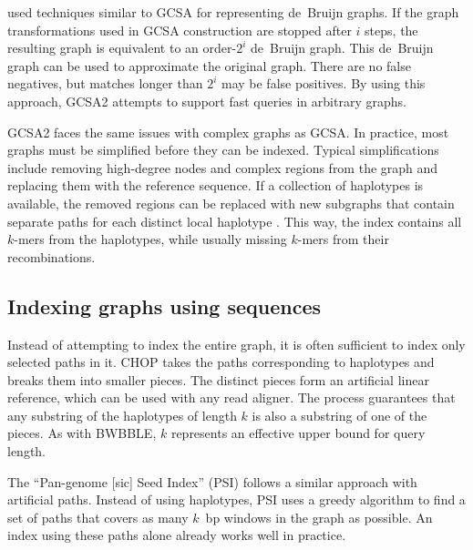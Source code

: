 \citeauthor{Bowe_2012} \cite{Bowe_2012} used techniques similar to GCSA for representing de~Bruijn graphs.
If the graph transformations used in GCSA construction are stopped after $i$ steps, the resulting graph is equivalent to an order-$2^{i}$ de~Bruijn graph.
This de~Bruijn graph can be used to approximate the original graph.
There are no false negatives, but matches longer than $2^{i}$ may be false positives.
By using this approach, GCSA2 \cite{Siren_2017} attempts to support fast queries in arbitrary graphs.

GCSA2 faces the same issues with complex graphs as GCSA.
In practice, most graphs must be simplified before they can be indexed.
Typical simplifications include removing high-degree nodes and complex regions from the graph and replacing them with the reference sequence.
If a collection of haplotypes is available, the removed regions can be replaced with new subgraphs that contain separate paths for each distinct local haplotype \cite{Siren_2019}.
This way, the index contains all $k$-mers from the haplotypes, while usually missing $k$-mers from their recombinations.

\subsection{Indexing graphs using sequences}

Instead of attempting to index the entire graph, it is often sufficient to index only selected paths in it.
CHOP \cite{Mokveld_2018} takes the paths corresponding to haplotypes and breaks them into smaller pieces.
The distinct pieces form an artificial linear reference, which can be used with any read aligner.
The process guarantees that any substring of the haplotypes of length $k$ is also a substring of one of the pieces.
As with BWBBLE, $k$ represents an effective upper bound for query length.

The ``Pan-genome [sic] Seed Index'' (PSI) \cite{Ghaffaari_2019} follows a similar approach with artificial paths.
Instead of using haplotypes, PSI uses a greedy algorithm to find a set of paths that covers as many $k$~bp windows in the graph as possible.
An index using these paths alone already works well in practice.

